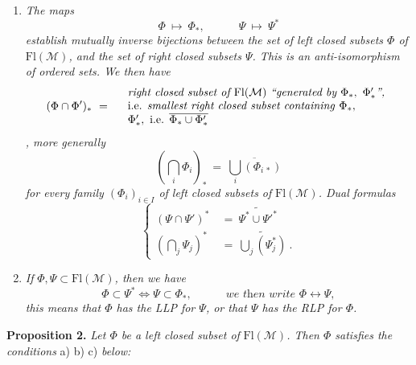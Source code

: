 \documentclass[11pt]{article}
\newcommand{\printedpage}[1]{\marginpar{\footnotesize p.~#1}}
\newcommand{\msp}[1]{\marginpar{\footnotesize [#1]}}
\newcommand{\Fl}{\mathrm{Fl}}
\newcommand{\M}{\mathcal{M}}
\begin{document}
\begin{enumerate}[label={}]
\item[c)] \textit{The maps}
\[
\Phi \ \longmapsto\ \Phi_*, \qquad\quad \Psi\ \longmapsto\ \Psi^*
\]
\textit{establish mutually inverse bijections between the set of left closed subsets $\Phi$ of} $\Fl(\M)$\textit{, and the set of right closed subsets $\Psi$. This is an anti-isomorphism of ordered sets. We then have}
\[
(\Phi \cap \Phi')_* \ = \quad
\begin{array}{l}
\textit{right closed subset of } \Fl(\M) \ \textit{``generated by } \Phi_*,\ \Phi'_*\textit{'',} \\
\text{i.e. \textit{smallest right closed subset containing} } \Phi_*, \\
\Phi'_*, \text{ i.e. } \overline{\Phi_* \cup \Phi'_*}
\end{array}
\]
\textit{, more generally}
\[
(\bigcap_i \Phi_i)_* \ = \ \overline{\bigcup_i (\Phi_{i\,*})}
\]
\textit{for every family $(\Phi_i)_{i \in I}$ of left closed subsets of} $\Fl(\M)$\textit{. Dual formulas}
\[
\left\{
\begin{aligned}
(\Psi \cap \Psi')^* \ &= \ \widetilde{\Psi^* \cup \Psi'^*} \\
(\bigcap_j \Psi_j)^* \ &= \ \widetilde{\bigcup_j (\Psi_j^*)}\ .
\end{aligned}
\right.
\]

\item[d)] \textit{If} $\Phi, \Psi \subset \Fl(\M)$\textit{, then we have}
\[
\Phi \subset \Psi^* \iff \Psi \subset \Phi_*, \qquad\quad \textit{we then write } \Phi \longleftrightarrow \Psi,
\]
\textit{this means that $\Phi$ has the LLP for $\Psi$, or that $\Psi$ has the RLP for $\Phi$.}
\end{enumerate}

\printedpage{3}

\msp{page 4}

\noindent\textbf{Proposition 2.} \textit{Let $\Phi$ be a left closed subset of} $\Fl(\M)$\textit{. Then $\Phi$ satisfies the conditions} a) b) c) \textit{below:}
\end{document}
